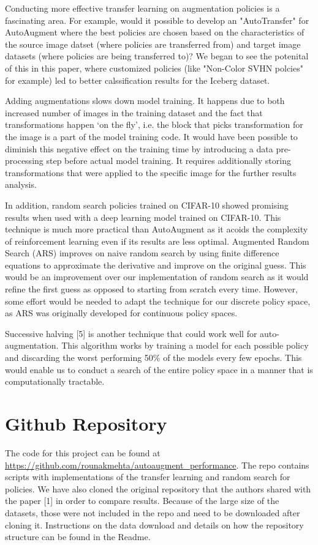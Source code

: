 \documentclass[10pt,twocolumn,letterpaper]{article}
\begin{document}
Conducting more effective transfer learning on augmentation policies is a fascinating area.  For example, would it possible to develop an "AutoTransfer" for AutoAugment where the best policies are chosen based on the characteristics of the source image datset (where policies are transferred from) and target image datasets (where policies are being transferred to)?  We began to see the potenital of this in this paper, where customized policies (like "Non-Color SVHN polcies" for example) led to better calssification results for the Iceberg dataset. 

Adding augmentations slows down model training. It happens due to both increased number of images in the training dataset and the fact that transformations happen ‘on the fly’, i.e. the block that picks transformation for the image is a part of the model training code. It would have been possible to diminish this negative effect on the training time by introducing a data pre-processing step before actual model training. It requires additionally storing transformations that were applied to the specific image for the further results analysis.

In addition, random search policies trained on CIFAR-10 showed promising results when used with a deep learning model trained on CIFAR-10. This technique is much more practical than AutoAugment as it acoids the complexity of reinforcement learning even if its results are less optimal. Augmented Random Search (ARS) improves on naive random search by using finite difference equations to approximate the derivative and improve on the original guess. This would be an improvement over our implementation of random search as it would refine the first guess as opposed to starting from scratch every time. However, some effort would be needed to adapt the technique for our discrete policy space, as ARS was originally developed for continuous policy spaces.

Successive halving [5] is another technique that could work well for auto-augmentation. This algorithm works by training a model for each possible policy and discarding the worst performing 50\% of the models every few epochs. This would enable us to conduct a search of the entire policy space in a manner that is computationally tractable.

\section{Github Repository}

The code for this project can be found at \url{https://github.com/rounakmehta/autoaugment_performance}. The repo contains scripts with implementations of the transfer learning and random search for policies. We have also cloned the original repository that the authors shared with the paper [1] in order to compare results. Because of the large size of the datasets, those were not included in the repo and need to be downloaded after cloning it. Instructions on the data download and details on how the repository structure can be found in the Readme.  
\end{document}
